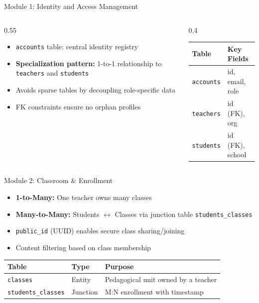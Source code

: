 \documentclass[aspectratio=169, 10pt]{beamer}
\begin{document}
\begin{frame}{Module 1: Identity and Access Management}
    \begin{columns}[T]
        \begin{column}{0.55\textwidth}
            \begin{itemize}
                \item \texttt{accounts} table: central identity registry
                \item \textbf{Specialization pattern:} 1-to-1 relationship to \texttt{teachers} and \texttt{students}
                \item Avoids sparse tables by decoupling role-specific data
                \item FK constraints ensure no orphan profiles
            \end{itemize}
        \end{column}
        \begin{column}{0.4\textwidth}
            \centering
            \small
            \begin{tabular}{|l|l|}
                \hline
                \textbf{Table} & \textbf{Key Fields} \\ \hline
                \texttt{accounts} & id, email, role \\ \hline
                \texttt{teachers} & id (FK), org \\ \hline
                \texttt{students} & id (FK), school \\ \hline
            \end{tabular}
        \end{column}
    \end{columns}
\end{frame}


\begin{frame}{Module 2: Classroom \& Enrollment}
    \begin{itemize}
        \item \textbf{1-to-Many:} One teacher owns many classes
        \item \textbf{Many-to-Many:} Students $\leftrightarrow$ Classes via junction table \texttt{students\_classes}
        \item \texttt{public\_id} (UUID) enables secure class sharing/joining
        \item Content filtering based on class membership
    \end{itemize}
    \vspace{0.3cm}
    \centering
    \small
    \begin{tabular}{|l|l|p{6cm}|}
        \hline
        \textbf{Table} & \textbf{Type} & \textbf{Purpose} \\ \hline
        \texttt{classes} & Entity & Pedagogical unit owned by a teacher \\ \hline
        \texttt{students\_classes} & Junction & M:N enrollment with timestamp \\ \hline
    \end{tabular}
\end{frame}
\end{document}
